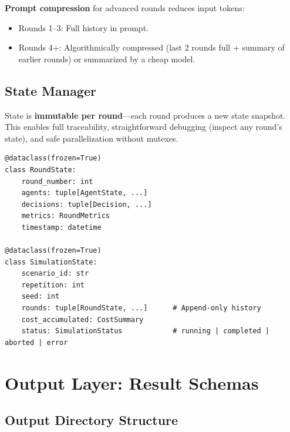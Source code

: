 \documentclass[12pt, a4paper]{article}
\begin{document}
\textbf{Prompt compression} for advanced rounds reduces input tokens:
\begin{itemize}
    \item Rounds 1--3: Full history in prompt.
    \item Rounds 4+: Algorithmically compressed (last 2 rounds full + summary of earlier rounds) or summarized by a cheap model.
\end{itemize}

\subsection{State Manager}

State is \textbf{immutable per round}---each round produces a new state snapshot. This enables full traceability, straightforward debugging (inspect any round's state), and safe parallelization without mutexes.

\begin{lstlisting}[style=python, caption={Immutable state data structures.}, label={lst:state}]
@dataclass(frozen=True)
class RoundState:
    round_number: int
    agents: tuple[AgentState, ...]
    decisions: tuple[Decision, ...]
    metrics: RoundMetrics
    timestamp: datetime

@dataclass(frozen=True)
class SimulationState:
    scenario_id: str
    repetition: int
    seed: int
    rounds: tuple[RoundState, ...]      # Append-only history
    cost_accumulated: CostSummary
    status: SimulationStatus            # running | completed | aborted | error
\end{lstlisting}

\section{Output Layer: Result Schemas}
\label{sec:output}

\subsection{Output Directory Structure}
\end{document}
